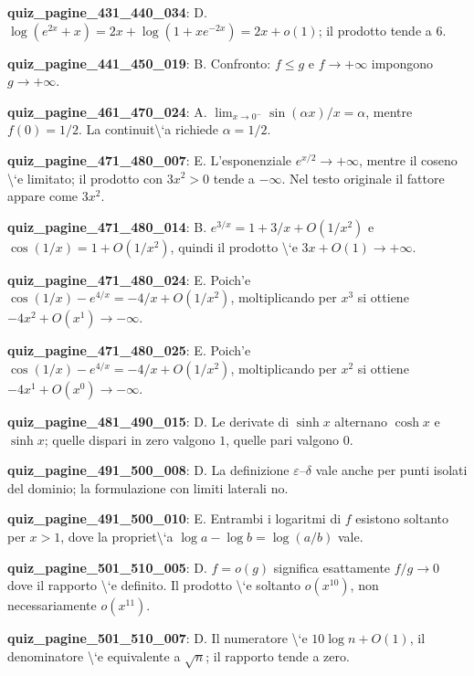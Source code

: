 \documentclass[11pt,a4paper]{article}
\newcounter{quiz}
\begin{document}
\noindent\textbf{quiz\_pagine\_431\_440\_034}: D. $\log(e^{2x}+x)=2x+\log(1+xe^{-2x})=2x+o(1)$; il prodotto tende a $6$.\par\medskip
\noindent\textbf{quiz\_pagine\_441\_450\_019}: B. Confronto: $f\le g$ e $f\to+\infty$ impongono $g\to+\infty$.\par\medskip
\noindent\textbf{quiz\_pagine\_461\_470\_024}: A. $\lim_{x\to0^-}\sin(\alpha x)/x=\alpha$, mentre $f(0)=1/2$. La continuit\textbackslash{}`a richiede $\alpha=1/2$.\par\medskip
\noindent\textbf{quiz\_pagine\_471\_480\_007}: E. L'esponenziale $e^{x/2}\to+\infty$, mentre il coseno \textbackslash{}`e limitato; il prodotto con $3x^2>0$ tende a $-\infty$. Nel testo originale il fattore appare come $3x^2$.\par\medskip
\noindent\textbf{quiz\_pagine\_471\_480\_014}: B. $e^{3/x}=1+3/x+O(1/x^2)$ e $\cos(1/x)=1+O(1/x^2)$, quindi il prodotto \textbackslash{}`e $3x+O(1)\to+\infty$.\par\medskip
\noindent\textbf{quiz\_pagine\_471\_480\_024}: E. Poich'e $\cos(1/x)-e^{4/x}=-4/x+O(1/x^2)$, moltiplicando per $x^3$ si ottiene $-4x^{2}+O(x^{1})\to-\infty$.\par\medskip
\noindent\textbf{quiz\_pagine\_471\_480\_025}: E. Poich'e $\cos(1/x)-e^{4/x}=-4/x+O(1/x^2)$, moltiplicando per $x^2$ si ottiene $-4x^{1}+O(x^{0})\to-\infty$.\par\medskip
\noindent\textbf{quiz\_pagine\_481\_490\_015}: D. Le derivate di $\sinh x$ alternano $\cosh x$ e $\sinh x$; quelle dispari in zero valgono $1$, quelle pari valgono $0$.\par\medskip
\noindent\textbf{quiz\_pagine\_491\_500\_008}: D. La definizione $\varepsilon$--$\delta$ vale anche per punti isolati del dominio; la formulazione con limiti laterali no.\par\medskip
\noindent\textbf{quiz\_pagine\_491\_500\_010}: E. Entrambi i logaritmi di $f$ esistono soltanto per $x>1$, dove la propriet\textbackslash{}`a $\log a-\log b=\log(a/b)$ vale.\par\medskip
\noindent\textbf{quiz\_pagine\_501\_510\_005}: D. $f=o(g)$ significa esattamente $f/g\to0$ dove il rapporto \textbackslash{}`e definito. Il prodotto \textbackslash{}`e soltanto $o(x^{10})$, non necessariamente $o(x^{11})$.\par\medskip
\noindent\textbf{quiz\_pagine\_501\_510\_007}: D. Il numeratore \textbackslash{}`e $10\log n+O(1)$, il denominatore \textbackslash{}`e equivalente a $\sqrt n$; il rapporto tende a zero.\par\medskip
\end{document}
